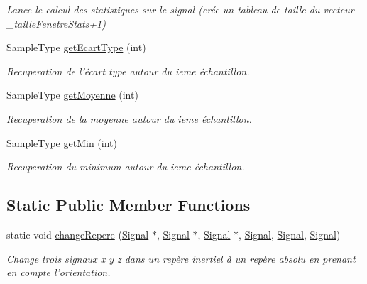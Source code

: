 \begin{DoxyCompactItemize}
\begin{DoxyCompactList}\small\item\em Lance le calcul des statistiques sur le signal (crée un tableau de taille du vecteur -\/\-\_\-taille\-Fenetre\-Stats+1) \end{DoxyCompactList}\item 
Sample\-Type \hyperlink{class_signal_a71191a77e1492967acd690b909cfd355}{get\-Ecart\-Type} (int)
\begin{DoxyCompactList}\small\item\em Recuperation de l'écart type autour du ieme échantillon. \end{DoxyCompactList}\item 
Sample\-Type \hyperlink{class_signal_a163edec705cd436b076904edb51c00bb}{get\-Moyenne} (int)
\begin{DoxyCompactList}\small\item\em Recuperation de la moyenne autour du ieme échantillon. \end{DoxyCompactList}\item 
Sample\-Type \hyperlink{class_signal_a37f82f2b4069d045f604d5d33d1c3296}{get\-Min} (int)
\begin{DoxyCompactList}\small\item\em Recuperation du minimum autour du ieme échantillon. \end{DoxyCompactList}\end{DoxyCompactItemize}
\subsection*{Static Public Member Functions}
\begin{DoxyCompactItemize}
\item 
static void \hyperlink{class_signal_afdc4a7cb6f8e9474d20527967a8161c8}{change\-Repere} (\hyperlink{class_signal}{Signal} $\ast$, \hyperlink{class_signal}{Signal} $\ast$, \hyperlink{class_signal}{Signal} $\ast$, \hyperlink{class_signal}{Signal}, \hyperlink{class_signal}{Signal}, \hyperlink{class_signal}{Signal})
\begin{DoxyCompactList}\small\item\em Change trois signaux x y z dans un repère inertiel à un repère absolu en prenant en compte l'orientation. \end{DoxyCompactList}\end{DoxyCompactItemize}


